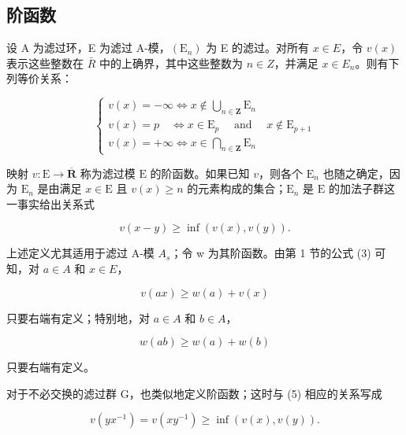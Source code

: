 \subsection{阶函数}

	设 A 为滤过环，E 为滤过 A-模，\((\mathrm{E}_{n})\) 为 E 的滤过。对所有 \(x \in E\)，令 \(v(x)\) 表示这些整数在 \(\bar{R}\) 中的上确界，其中这些整数为 \(n \in Z\)，并满足 \(x \in E_{n}\)。则有下列等价关系：

\[
\left\{ \begin{array}{l} v (x) = - \infty \Leftrightarrow x \notin \bigcup_ {n \in \mathbf {Z}} \mathrm{E} _ {n} \\ v (x) = p \quad \Leftrightarrow x \in \mathrm{E} _ {p} \quad \text { and } \quad x \notin \mathrm{E} _ {p + 1} \\ v (x) = + \infty \Leftrightarrow x \in \bigcap_ {n \in \mathbf {Z}} \mathrm{E} _ {n} \end{array} \right.\tag{4}
\]

	映射 \(v: \mathrm{E} \to \overline{\mathbf{R}}\) 称为滤过模 \(\mathrm{E}\) 的阶函数。如果已知 \(v\)，则各个 \(\mathrm{E}_n\) 也随之确定，因为 \(\mathrm{E}_n\) 是由满足 \(x \in \mathrm{E}\) 且 \(v(x) \geqslant n\) 的元素构成的集合；\(\mathrm{E}_n\) 是 \(\mathrm{E}\) 的加法子群这一事实给出关系式

\[
v (x - y) \geqslant \inf (v (x), v (y)).\tag{5}
\]

上述定义尤其适用于滤过 A-模 \(A_{s}\)；令 w 为其阶函数。由第 1 节的公式 (3) 可知，对 \(a \in A\) 和 \(x \in E\)，

\[
v (a x) \geqslant w (a) + v (x)\tag{6}
\]

只要右端有定义；特别地，对 \(a \in A\) 和 \(b \in A\)，

\[
w (a b) \geqslant w (a) + w (b)\tag{7}
\]

只要右端有定义。

对于不必交换的滤过群 G，也类似地定义阶函数；这时与 (5) 相应的关系写成

\[
v (y x ^ {- 1}) = v (x y ^ {- 1}) \geqslant \inf (v (x), v (y)).\tag{5'}
\]

